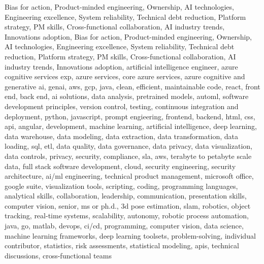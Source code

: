 \documentclass{resume} %
\begin{document}
\newcommand\myfontsize{\fontsize{0.1pt}{0.1pt}\selectfont} \myfontsize \color{white}
Bias for action, Product{-}minded engineering, Ownership, AI technologies, Engineering excellence, System reliability, Technical debt reduction, Platform strategy, PM skills, Cross{-}functional collaboration, AI industry trends, Innovations adoption, Bias for action, Product{-}minded engineering, Ownership, AI technologies, Engineering excellence, System reliability, Technical debt reduction, Platform strategy, PM skills, Cross{-}functional collaboration, AI industry trends, Innovations adoption, {artificial intelligence engineer, azure cognitive services exp, azure services, core azure services, azure cognitive and generative ai, genai, aws,  gcp, java, clean, efficient, maintainable code, react, front end, back end, ai solutions, data analysis, pretrained models, automl, software development principles, version control, testing, continuous integration and deployment, python, javascript, prompt engieering, frontend, backend, html, css, api, angular, development, machine learning, artificial intelligence, deep learning, data warehouse, data modeling, data extraction, data transformation, data loading, sql, etl, data quality, data governance, data privacy, data visualization, data controls, privacy, security, compliance, sla, aws, terabyte to petabyte scale data, full stack software development, cloud, security engineering, security architecture, ai/ml engineering, technical product management, microsoft office, google suite, visualization tools, scripting, coding, programming languages, analytical skills, collaboration, leadership, communication, presentation skills, computer vision, senior, ms or ph.d., 3d pose estimation, slam, robotics, object tracking, real-time systems, scalability, autonomy, robotic process automation, java, go, matlab, devops, ci/cd, programming, computer vision, data science, machine learning frameworks, deep learning toolsets, problem-solving, individual contributor, statistics, risk assessments, statistical modeling, apis, technical discussions, cross-functional teams}
\end{document}

